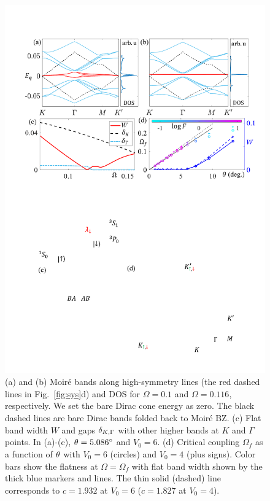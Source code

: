 \documentclass[twocolumn,english,prl,floatfix,citeautoscript,nofootinbib]{revtex4}
\begin{document}
\begin{figure}[tb]
\includegraphics[width=1.0\linewidth]{figure2_r.pdf}
\caption{(a) and (b) Moir\'{e} bands along high-symmetry lines (the red
dashed lines in Fig.~\protect\ref{fig:sys}d) and DOS for $\Omega =0.1$ and $%
\Omega =0.116$, respectively. We set the bare Dirac cone energy
as zero. The black dashed lines are bare Dirac bands folded back to Moir\'{e%
} BZ. (c) Flat band width $W$ and gaps $\protect\delta _{K,\Gamma }$ with
other higher bands at $K$ and $\Gamma $ points. In (a)-(c), $\protect\theta %
=5.086^{\circ }$ and $V_{0}=6$. (d) Critical coupling $\Omega _{f}$ as a
function of $\protect\theta $ with $V_{0}=6$ (circles) and $V_{0}=4$ (plus
signs). Color bars show the flatness at $\Omega =\Omega _{f}$ with flat band
width shown by the thick blue markers and lines. The thin solid (dashed)
line corresponds to $c =1.932$ at $V_{0}=6$ ($c %
=1.827$ at $V_{0}=4$). }
\label{fig:bands}
\end{figure}
\end{document}
